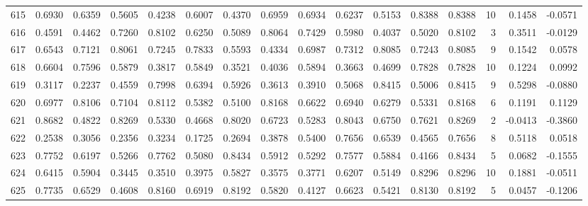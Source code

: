 \begin{tabular}{lrrrrrrrrrrrrrrr}
615 &      0.6930 &  0.6359 &  0.5605 &  0.4238 &  0.6007 &  0.4370 &  0.6959 &  0.6934 &  0.6237 &  0.5153 &   0.8388 &     0.8388 &     10 &                    0.1458 &                    -0.0571 \\
616 &      0.4591 &  0.4462 &  0.7260 &  0.8102 &  0.6250 &  0.5089 &  0.8064 &  0.7429 &  0.5980 &  0.4037 &   0.5020 &     0.8102 &      3 &                    0.3511 &                    -0.0129 \\
617 &      0.6543 &  0.7121 &  0.8061 &  0.7245 &  0.7833 &  0.5593 &  0.4334 &  0.6987 &  0.7312 &  0.8085 &   0.7243 &     0.8085 &      9 &                    0.1542 &                     0.0578 \\
618 &      0.6604 &  0.7596 &  0.5879 &  0.3817 &  0.5849 &  0.3521 &  0.4036 &  0.5894 &  0.3663 &  0.4699 &   0.7828 &     0.7828 &     10 &                    0.1224 &                     0.0992 \\
619 &      0.3117 &  0.2237 &  0.4559 &  0.7998 &  0.6394 &  0.5926 &  0.3613 &  0.3910 &  0.5068 &  0.8415 &   0.5006 &     0.8415 &      9 &                    0.5298 &                    -0.0880 \\
620 &      0.6977 &  0.8106 &  0.7104 &  0.8112 &  0.5382 &  0.5100 &  0.8168 &  0.6622 &  0.6940 &  0.6279 &   0.5331 &     0.8168 &      6 &                    0.1191 &                     0.1129 \\
621 &      0.8682 &  0.4822 &  0.8269 &  0.5330 &  0.4668 &  0.8020 &  0.6723 &  0.5283 &  0.8043 &  0.6750 &   0.7621 &     0.8269 &      2 &                   -0.0413 &                    -0.3860 \\
622 &      0.2538 &  0.3056 &  0.2356 &  0.3234 &  0.1725 &  0.2694 &  0.3878 &  0.5400 &  0.7656 &  0.6539 &   0.4565 &     0.7656 &      8 &                    0.5118 &                     0.0518 \\
623 &      0.7752 &  0.6197 &  0.5266 &  0.7762 &  0.5080 &  0.8434 &  0.5912 &  0.5292 &  0.7577 &  0.5884 &   0.4166 &     0.8434 &      5 &                    0.0682 &                    -0.1555 \\
624 &      0.6415 &  0.5904 &  0.3445 &  0.3510 &  0.3975 &  0.5827 &  0.3575 &  0.3771 &  0.6207 &  0.5149 &   0.8296 &     0.8296 &     10 &                    0.1881 &                    -0.0511 \\
625 &      0.7735 &  0.6529 &  0.4608 &  0.8160 &  0.6919 &  0.8192 &  0.5820 &  0.4127 &  0.6623 &  0.5421 &   0.8130 &     0.8192 &      5 &                    0.0457 &                    -0.1206 \\

\end{tabular}
